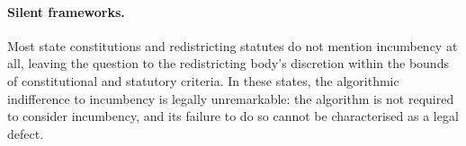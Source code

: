 \paragraph{Silent frameworks.}
Most state constitutions and redistricting statutes do not mention incumbency at all,
leaving the question to the redistricting body's discretion within the bounds of
constitutional and statutory criteria. In these states, the algorithmic indifference
to incumbency is legally unremarkable: the algorithm is not required to consider
incumbency, and its failure to do so cannot be characterised as a legal defect.
